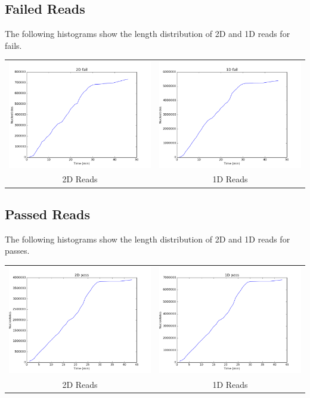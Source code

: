 \subsection*{Failed Reads}

        The following histograms show the length distribution of 2D and 1D reads for fails.
       
        \begin{tabular}{cc}
          \includegraphics[width=.48\textwidth]{failcum2D}
          &
          \includegraphics[width=.48\textwidth]{failcum1D}
          \\
          2D Reads
          &
          1D Reads
        \end{tabular}

\subsection*{Passed Reads}

        The following histograms show the length distribution of 2D and 1D reads for passes.

        
        \begin{tabular}{cc}
          \includegraphics[width=.48\textwidth]{passcum2D}
          &
          \includegraphics[width=.48\textwidth]{passcum1D}
          \\
          2D Reads
          &
          1D Reads
        \end{tabular}
